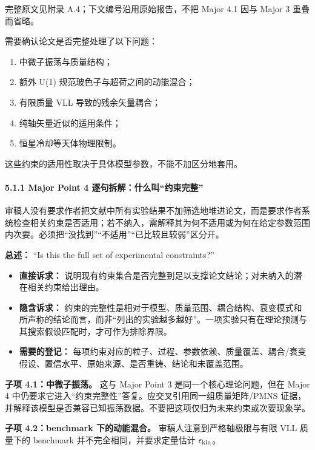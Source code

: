 \documentclass[
]{article}
\providecommand{\tightlist}{%
  \setlength{\itemsep}{0pt}\setlength{\parskip}{0pt}}
\begin{document}
完整原文见附录 A.4；下文编号沿用原始报告，不把 Major 4.1 因与 Major 3
重叠而省略。

需要确认论文是否完整处理了以下问题：

\begin{enumerate}
\def\labelenumi{\arabic{enumi}.}
\tightlist
\item
  中微子振荡与质量结构；
\item
  额外 U(1) 规范玻色子与超荷之间的动能混合；
\item
  有限质量 VLL 导致的残余矢量耦合；
\item
  纯轴矢量近似的适用条件；
\item
  恒星冷却等天体物理限制。
\end{enumerate}

这些约束的适用性取决于具体模型参数，不能不加区分地套用。

\paragraph{5.1.1 Major Point 4
逐句拆解：什么叫``约束完整''}\label{major-point-4-ux9010ux53e5ux62c6ux89e3ux4ec0ux4e48ux53ebux7ea6ux675fux5b8cux6574}

审稿人没有要求作者把文献中所有实验结果不加筛选地堆进论文，而是要求作者系统检查相关约束是否适用；若不纳入，需解释其为何不适用或为何在给定参数范围内次要。必须把``没找到''``不适用''``已比较且较弱''区分开。

\textbf{总述：} ``Is this the full set of experimental constraints?''

\begin{itemize}
\tightlist
\item
  \textbf{直接诉求：}
  说明现有约束集合是否完整到足以支撑论文结论；对未纳入的潜在相关约束给出理由。
\item
  \textbf{隐含诉求：}
  约束的完整性是相对于模型、质量范围、耦合结构、衰变模式和所声称的结论而言，而非``列出的实验越多越好''。一项实验只有在理论预测与其搜索假设匹配时，才可作为排除界限。
\item
  \textbf{需要的登记：}
  每项约束对应的粒子、过程、参数依赖、质量覆盖、耦合/衰变假设、置信水平、原始来源、是否重铸、结论和未覆盖范围。
\end{itemize}

\textbf{子项 4.1：中微子振荡。} 这与 Major Point 3
是同一个核心理论问题，但在 Major 4
中仍要求它进入``约束完整性''答复。应交叉引用同一组质量矩阵/PMNS
证据，并解释该模型是否兼容已知振荡数据。不要把这项仅归为未来约束或次要现象学。

\textbf{子项 4.2：benchmark 下的动能混合。} 审稿人注意到严格轴极限与有限
VLL 质量下的 benchmark 并不完全相同，并要求定量估计
\(\epsilon_{\rm kin}\)。
\end{document}
